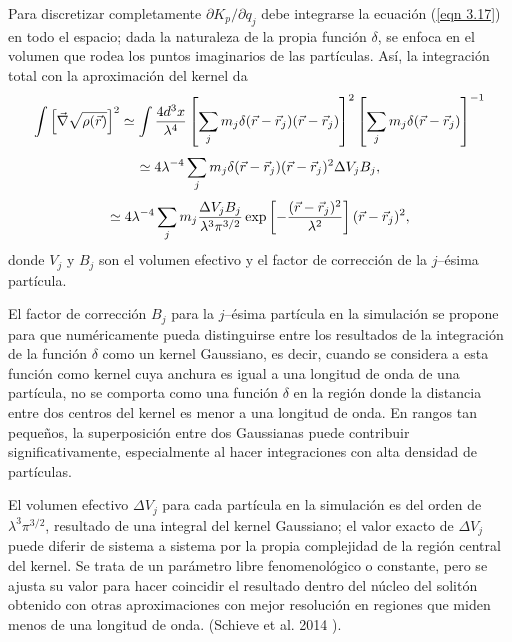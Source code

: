 \documentclass[a4paper,openright,10pt, oneside, final]{book}
\begin{document}
Para discretizar completamente $\partial K_{p}/\partial q_{j}$ debe integrarse la ecuación (\ref{eqn 3.17}) en todo el espacio; dada la naturaleza de la propia función $\delta$, se enfoca en el volumen que rodea los puntos imaginarios de las partículas. Así, la integración total con la aproximación del kernel da
\begin{equation}
\int\left[\vec{\nabla}\sqrt{\rho (\vec{r})}\right]^{2}  \simeq 
\int \footnotesize{\frac{4 d^{3}x}{\lambda^{4}}
\left[
\sum_{j} m_{j}\delta(\vec{r}-\vec{r}_{j})(\vec{r}-\vec{r}_{j})
\right]^{2}
\left[
\sum_{j}m_{j}\delta(\vec{r}-\vec{r}_{j})
\right]^{-1}}\label{eqn 3.18}
\end{equation} 
\begin{equation}
\simeq
\footnotesize{4\lambda ^{-4} 
\sum_{j}m_{j}\delta(\vec{r}-\vec{r}_{j})(\vec{r}-\vec{r}_{j})^{2}\Delta V_{j}B_{j},}\label{eqn 3.19}
\end{equation}
\begin{equation}
\simeq
\footnotesize{4\lambda^{-4}
\sum_{j}m_{j}
\frac{\Delta V_{j}B_{j}}{\lambda^{3}\pi^{3/2}}
\exp\left[-\frac{(\vec{r}-\vec{r}_{j})^{2}}{\lambda^{2}}\right]
(\vec{r}-\vec{r}_{j})^{2},} \label{eqn 3.20}
\end{equation}
donde $V_{j}$ y $B_{j}$ son el volumen efectivo y el factor de corrección de la $j$--ésima partícula. 

El factor de corrección $B_{j}$ para la $j$--ésima partícula en la simulación se propone para que numéricamente pueda distinguirse entre los resultados de la integración de la función $\delta$ como un kernel Gaussiano, es decir,  cuando se considera a esta función como kernel cuya anchura es igual a una longitud de onda de una partícula, no se comporta como una función $\delta$ en la  región donde la distancia entre dos centros del kernel es menor a una longitud de onda. En rangos tan pequeños, la superposición entre dos Gaussianas puede contribuir significativamente, especialmente al hacer integraciones con alta densidad de partículas.

El volumen efectivo $\Delta V_{j}$ para cada partícula en la simulación es del orden de $\lambda^{3}\pi^{3/2}$, resultado de una integral del kernel Gaussiano; el valor exacto de $\Delta V_{j}$ puede diferir de  sistema a sistema por la propia complejidad de la región central del kernel. Se trata de un parámetro libre fenomenológico o constante, pero se ajusta su valor para hacer coincidir el resultado dentro del núcleo del solitón obtenido con otras aproximaciones con mejor resolución en regiones que miden menos de una longitud de onda. (Schieve et al. 2014 \cite{3.5}).
\end{document}
